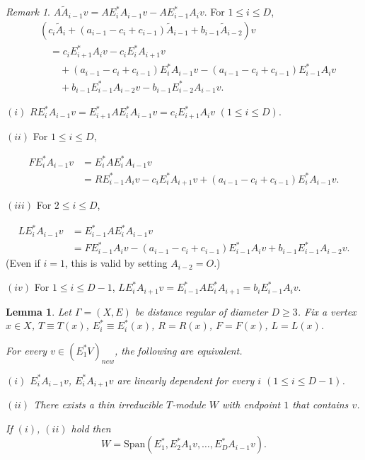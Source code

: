\documentclass[
]{book}
\newtheorem{lemma}{Lemma}[chapter]
\theoremstyle{definition}
\theoremstyle{definition}
\theoremstyle{definition}
\theoremstyle{definition}
\theoremstyle{remark}
\newtheorem*{remark}{Remark}
\begin{document}
\begin{remark}

\(A\tilde{A}_{i-1}v = AE^*_iA_{i-1}v - AE^*_{i-1}A_iv\). For \(1\leq i\leq D\),
\begin{align}
& (c_i\tilde{A}_i + (a_{i-1}-c_i+c_{i-1})\tilde{A}_{i-1}+b_{i-1}\tilde{A}_{i-2})v\\
& \quad = c_i E^*_{i+1}A_iv - c_iE^*_iA_{i+1}v\\
& \qquad + (a_{i-1}-c_i+c_{i-1})E^*_iA_{i-1}v - (a_{i-1}-c_i+c_{i-1})E^*_{i-1}A_iv\\
& \qquad + b_{i-1}E^*_{i-1}A_{i-2}v - b_{i-1}E^*_{i-2}A_{i-1}v.
\end{align}

\((i)\) \(RE^*_iA_{i-1}v = E^*_{i+1}AE^*_iA_{i-1}v = c_iE^*_{i+1}A_iv\) \((1\leq i\leq D)\).

\((ii)\) For \(1\leq i\leq D\),

\begin{align}
FE^*_iA_{i-1}v & = E^*_{i}AE^*_iA_{i-1}v\\
& = RE^*_{i-1}A_iv - c_iE^*_iA_{i+1}v + (a_{i-1}-c_i+c_{i-1})E^*_iA_{i-1}v.
\end{align}

\((iii)\) For \(2\leq i\leq D\),

\begin{align}
LE^*_iA_{i-1}v & = E^*_{i-1}AE^*_{i}A_{i-1}v\\
& = FE^*_{i-1}A_iv - (a_{i-1}-c_i+c_{i-1})E^*_{i-1}A_i v + b_{i-1}E^*_{i-1}A_{i-2}v.
\end{align}
(Even if \(i=1\), this is valid by setting \(A_{i-2}=O\).)

\((iv)\) For \(1\leq i\leq D-1\), \(LE^*_iA_{i+1}v = E^*_{i-1}AE^*_i A_{i+1} = b_iE^*_{i-1}A_iv\).

\end{remark}

\begin{lemma}
\protect\hypertarget{lem:generator-endpoint1-mod}{}\label{lem:generator-endpoint1-mod}Let \(\Gamma = (X, E)\) be distance regular of diameter \(D\geq 3\). Fix a vertex \(x\in X\), \(T\equiv T(x)\), \(E^*_i\equiv E^*_i(x)\), \(R = R(x)\), \(F = F(x)\), \(L = L(x)\).

For every \(v\in (E^*_1V)_{new}\), the following are equivalent.

\((i)\) \(E^*_iA_{i-1}v\), \(E^*_{i}A_{i+1}v\) are linearly dependent for every \(i\) \((1\leq i\leq D-1)\).

\((ii)\) There exists a thin irreducible \(T\)-module \(W\) with endpoint \(1\) that contains \(v\).

If \((i)\), \((ii)\) hold then
\[W = \mathrm{Span}(E^*_1, E^*_2A_1v, \ldots, E^*_DA_{i-1}v).\]
\end{lemma}
\end{document}
